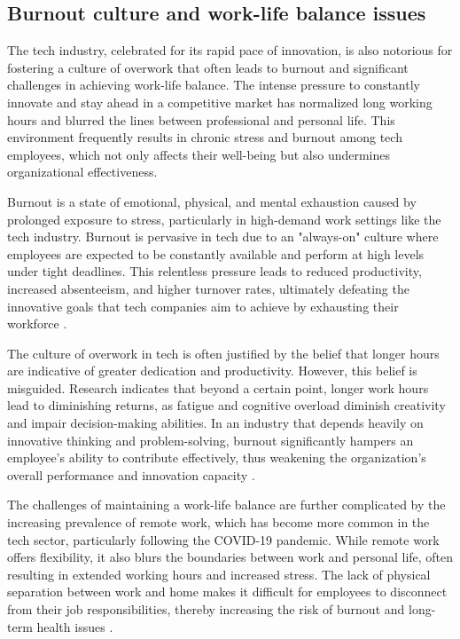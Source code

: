 \subsection{Burnout culture and work-life balance issues}

The tech industry, celebrated for its rapid pace of innovation, is also notorious for fostering a culture of overwork that often leads to burnout and significant challenges in achieving work-life balance. The intense pressure to constantly innovate and stay ahead in a competitive market has normalized long working hours and blurred the lines between professional and personal life. This environment frequently results in chronic stress and burnout among tech employees, which not only affects their well-being but also undermines organizational effectiveness.

Burnout is a state of emotional, physical, and mental exhaustion caused by prolonged exposure to stress, particularly in high-demand work settings like the tech industry. Burnout is pervasive in tech due to an "always-on" culture where employees are expected to be constantly available and perform at high levels under tight deadlines. This relentless pressure leads to reduced productivity, increased absenteeism, and higher turnover rates, ultimately defeating the innovative goals that tech companies aim to achieve by exhausting their workforce \cite[pp.~397-422]{maslach2001job}.

The culture of overwork in tech is often justified by the belief that longer hours are indicative of greater dedication and productivity. However, this belief is misguided. Research indicates that beyond a certain point, longer work hours lead to diminishing returns, as fatigue and cognitive overload diminish creativity and impair decision-making abilities. In an industry that depends heavily on innovative thinking and problem-solving, burnout significantly hampers an employee’s ability to contribute effectively, thus weakening the organization’s overall performance and innovation capacity \cite[pp.~23-25]{pfeffer2018dying}.

The challenges of maintaining a work-life balance are further complicated by the increasing prevalence of remote work, which has become more common in the tech sector, particularly following the COVID-19 pandemic. While remote work offers flexibility, it also blurs the boundaries between work and personal life, often resulting in extended working hours and increased stress. The lack of physical separation between work and home makes it difficult for employees to disconnect from their job responsibilities, thereby increasing the risk of burnout and long-term health issues \cite[pp.~125-127]{bailyn2016breaking}.

